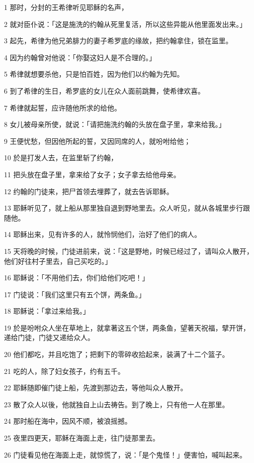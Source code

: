 \par 1 那时，分封的王希律听见耶稣的名声，
\par 2 就对臣仆说：「这是施洗的约翰从死里复活，所以这些异能从他里面发出来。」
\par 3 起先，希律为他兄弟腓力的妻子希罗底的缘故，把约翰拿住，锁在监里。
\par 4 因为约翰曾对他说：「你娶这妇人是不合理的。」
\par 5 希律就想要杀他，只是怕百姓，因为他们以约翰为先知。
\par 6 到了希律的生日，希罗底的女儿在众人面前跳舞，使希律欢喜。
\par 7 希律就起誓，应许随他所求的给他。
\par 8 女儿被母亲所使，就说：「请把施洗约翰的头放在盘子里，拿来给我。」
\par 9 王便忧愁，但因他所起的誓，又因同席的人，就吩咐给他；
\par 10 於是打发人去，在监里斩了约翰，
\par 11 把头放在盘子里，拿来给了女子；女子拿去给他母亲。
\par 12 约翰的门徒来，把尸首领去埋葬了，就去告诉耶稣。
\par 13 耶稣听见了，就上船从那里独自退到野地里去。众人听见，就从各城里步行跟随他。
\par 14 耶稣出来，见有许多的人，就怜悯他们，治好了他们的病人。
\par 15 天将晚的时候，门徒进前来，说：「这是野地，时候已经过了，请叫众人散开，他们好往村子里去，自己买吃的。」
\par 16 耶稣说：「不用他们去，你们给他们吃吧！」
\par 17 门徒说：「我们这里只有五个饼，两条鱼。」
\par 18 耶稣说：「拿过来给我。」
\par 19 於是吩咐众人坐在草地上，就拿著这五个饼，两条鱼，望著天祝福，擘开饼，递给门徒，门徒又递给众人。
\par 20 他们都吃，并且吃饱了；把剩下的零碎收拾起来，装满了十二个篮子。
\par 21 吃的人，除了妇女孩子，约有五千。
\par 22 耶稣随即催门徒上船，先渡到那边去，等他叫众人散开。
\par 23 散了众人以後，他就独自上山去祷告。到了晚上，只有他一人在那里。
\par 24 那时船在海中，因风不顺，被浪摇撼。
\par 25 夜里四更天，耶稣在海面上走，往门徒那里去。
\par 26 门徒看见他在海面上走，就惊慌了，说：「是个鬼怪！」便害怕，喊叫起来。
